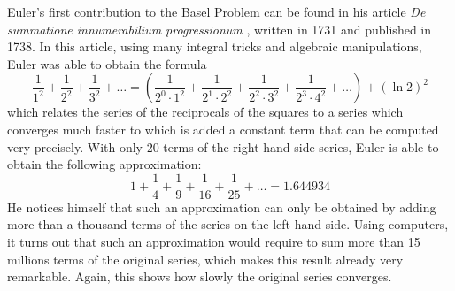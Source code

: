 Euler's first contribution to the Basel Problem can be found in his article \textit{De summatione innumerabilium progressionum} \cite{eulerE20}, written in 1731 and published in 1738. In this article, using many integral tricks and algebraic manipulations, Euler was able to obtain the formula
\begin{equation} \label{zeta 2 and (ln 2)^2}
    \frac{1}{1^2} + \frac{1}{2^2} + \frac{1}{3^2} + \dots = \left(\frac{1}{2^0\cdot 1^2} + \frac{1}{2^1\cdot 2^2} + \frac{1}{2^2\cdot 3^2} + \frac{1}{2^3\cdot 4^2} + \dots \right) + (\ln 2)^2
\end{equation}
which relates the series of the reciprocals of the squares to a series which converges much faster to which is added a constant term that can be computed very precisely. With only 20 terms of the right hand side series, Euler is able to obtain the following approximation:
$$1 + \frac{1}{4} + \frac{1}{9} + \frac{1}{16} + \frac{1}{25} + \dots = 1.644934$$
He notices himself that such an approximation can only be obtained by adding more than a thousand terms of the series on the left hand side. Using computers, it turns out that such an approximation would require to sum more than 15 millions terms of the original series, which makes this result already very remarkable. Again, this shows how slowly the original series converges.

